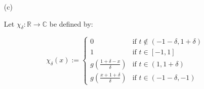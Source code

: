 \documentclass[12pt, reqno]{amsart}
\theoremstyle{definition}
\theoremstyle{remark}
\begin{document}
\begin{itemize}
\begin{itemize}
\begin{proof}
\vspace*{10 pt}

By (PMI), we have $g\in\mathcal{C}^{\infty}$.
\end{proof}

\vspace{0.1 cm}
\item[(c)] %



Let $\chi_\delta:\mathbb{R}\to\mathbb{C}$ be defined by:

\begin{equation}
    \chi_{\delta}(x):=\begin{cases} 
        0 & \text{if }t\notin(-1-\delta,1+\delta) \\
    1 & \text{if }t\in[-1,1] \\
    g\left(\frac{1+\delta-x}{\delta}\right) & \text{if }t\in(1,1+\delta) \\
    g\left(\frac{x+1+\delta}{\delta}\right) & \text{if }t\in(-1-\delta,-1)
    \end{cases}
\end{equation}


\end{itemize}
\end{itemize}
\end{document}
